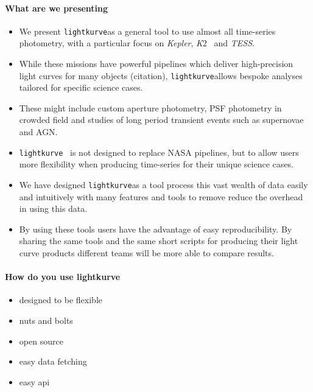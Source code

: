\documentclass[twocolumn]{aastex62}
\newcommand{\ktwo}{{\it K$\mathit{2}$}}
\newcommand{\tess}{{\it TESS}}
\newcommand{\kepler}{{\it Kepler}}
\newcommand{\lightkurve}{\texttt{lightkurve}}
\begin{document}
\paragraph{What are we presenting}
\begin{itemize}
\item{We present \lightkurve as a general tool to use almost all time-series photometry, with a particular focus on \kepler, \ktwo~ and \tess.}
\item While these missions have powerful pipelines which deliver high-precision light curves for many objects (citation), \lightkurve allows bespoke analyses tailored for specific science cases.
\item These might include custom aperture photometry, PSF photometry in crowded field and studies of long period transient events such as supernovae and AGN.
\item \lightkurve~ is not designed to replace NASA pipelines, but to allow users more flexibility when producing time-series for their unique science cases.
\item{We have designed \lightkurve as a tool process this vast wealth of data easily and intuitively with many features and tools to remove reduce the overhead in using this data.}
\item By using these tools users have the advantage of easy reproducibility. By sharing the same tools and the same short scripts for producing their light curve products different teams will be more able to compare results.
\end{itemize}

\paragraph{How do you use lightkurve}
\begin{itemize}
\item designed to be flexible
\item nuts and bolts
\item open source
\item easy data fetching
\item easy api
\end{itemize}
\end{document}
